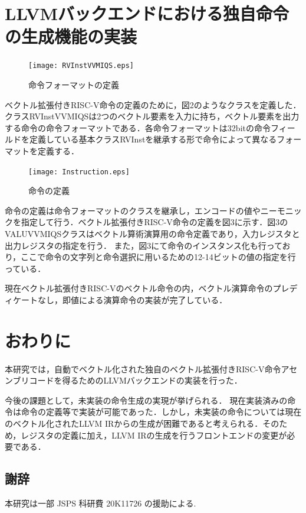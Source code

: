 \documentclass[a4paper,9pt, twocolumn]{jarticle}
\renewcommand{\baselinestretch}{0.87}   %
\begin{document}
\section{LLVMバックエンドにおける独自命令の生成機能の実装}

\begin{figure}[t]
    \centering
        \texttt{[image: RVInstVVMIQS.eps]}
    \caption{命令フォーマットの定義}
    \label{fig:Instruciton_format}
\end{figure}

ベクトル拡張付きRISC-V命令の定義のために，図2のようなクラスを定義した．クラスRVInstVVMIQSは2つのベクトル要素を入力に持ち，ベクトル要素を出力する命令の命令フォーマットである．各命令フォーマットは32bitの命令フィールドを定義している基本クラスRVInstを継承する形で命令によって異なるフォーマットを定義する．

\begin{figure}[t]
    \centering
        \texttt{[image: Instruction.eps]}
    \caption{命令の定義}
    \label{fig:Instruciton}
\end{figure}

命令の定義は命令フォーマットのクラスを継承し，エンコードの値やニーモニックを指定して行う．ベクトル拡張付きRISC-V命令の定義を図3に示す．図3のVALUVVMIQSクラスはベクトル算術演算用の命令定義であり，入力レジスタと出力レジスタの指定を行う．
また，図3にて命令のインスタンス化も行っており，ここで命令の文字列と命令選択に用いるための12-14ビットの値の指定を行っている．

現在ベクトル拡張付きRISC-Vのベクトル命令の内，ベクトル演算命令のプレディケートなし，即値による演算命令の実装が完了している．

\section{おわりに}
本研究では，自動でベクトル化された独自のベクトル拡張付きRISC-V命令アセンブリコードを得るためのLLVMバックエンドの実装を行った．

今後の課題として，未実装の命令生成の実現が挙げられる．
現在実装済みの命令は命令の定義等で実装が可能であった．しかし，未実装の命令については現在のベクトル化されたLLVM IRからの生成が困難であると考えられる．そのため，レジスタの定義に加え，LLVM IRの生成を行うフロントエンドの変更が必要である．

\renewcommand{\baselinestretch}{0.83}\selectfont
\subsection*{\small 謝辞}
\vspace{-0.5mm}
{\small 本研究は一部 JSPS 科研費 20K11726 の援助による.}
\end{document}
